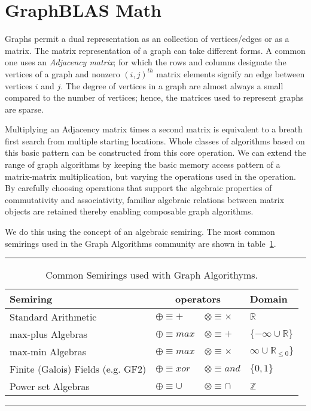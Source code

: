 \section{GraphBLAS Math}
\label{sec:math}

Graphs permit a dual representation as an 
collection of vertices/edges or as a matrix.  The matrix representation
of a graph can take different forms.  A common one uses an 
\emph{ Adjacency matrix}; for which the rows and columns designate the vertices
of a graph and nonzero $(i,j)^{th}$ matrix elements signify an edge between 
vertices $i$ and $j$.   The degree of vertices in a graph are almost always a small
compared to the number of vertices; hence, the matrices used to represent
graphs are sparse.

Multiplying an Adjacency matrix times a second matrix is equivalent to a breath 
first search from multiple starting locations.   Whole classes of algorithms
based on this basic pattern can be constructed from this core operation.
We can extend the range of graph algorithms by keeping the basic
memory access pattern of a matrix-matrix multiplication, but varying
the operations used in the operation.  By carefully choosing operations 
that support the algebraic properties of commutativity and associativity, familiar
algebraic relations between matrix objects are retained thereby enabling
composable graph algorithms.

We do this using the concept of an algebraic semiring.   The most 
common semirings used in the Graph Algorithms community are 
shown in table~\ref{Tab:semirings}.

  
\begin{table}[h]
\hrule
\begin{center}
\caption{Common Semirings used with Graph Algorithyms.}
\label{Tab:semirings}
\begin{tabular}{llll}
{\sf Semiring} & \multicolumn{2}{c}{operators} & Domain \\
\hline
Standard Arithmetic         & $\oplus   \equiv + $ & $\otimes \equiv   \times $  & $ \mathbb{R} $\\
max-plus Algebras           & $\oplus   \equiv max $ & $\otimes \equiv  + $  & $  \{-\infty \cup  \mathbb{R} \}$\\
max-min Algebras           & $\oplus   \equiv max $ & $\otimes \equiv  \times $  & $  \infty \cup  \mathbb{R}_{\leq 0}\} $\\
Finite (Galois) Fields (e.g. GF2)      & $\oplus   \equiv xor $ & $\otimes \equiv  and $  & $  \{0, 1\}$\\
Power set Algebras         & $\oplus   \equiv \cup $ & $\otimes \equiv  \cap $  & $  \mathbb{Z} $\\
\end{tabular}
\end{center}
\hrule
\end{table}

